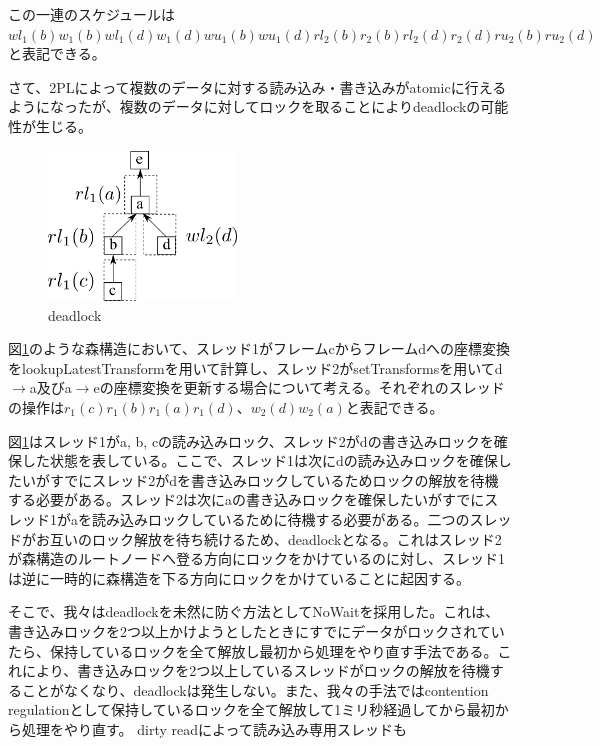 \documentclass[a4paper]{jreport}	%
\begin{document}
この一連のスケジュールは$wl_1(b)w_1(b)wl_1(d)w_1(d)wu_1(b)wu_1(d)rl_2(b)r_2(b)rl_2(d)r_2(d)ru_2(b)ru_2(d)$と表記できる。

さて、2PLによって複数のデータに対する読み込み・書き込みがatomicに行えるようになったが、複数のデータに対してロックを取ることによりdeadlockの可能性が生じる。


\begin{figure}[h] 
\centering
\includegraphics[width=5cm]{deadlock}
\caption{deadlock}
\label{fig:deadlock}
\end{figure}

図\ref{fig:deadlock}のような森構造において、スレッド1がフレームcからフレームdへの座標変換をlookupLatestTransformを用いて計算し、スレッド2がsetTransformsを用いてd$\rightarrow$a及びa$\rightarrow$eの座標変換を更新する場合について考える。それぞれのスレッドの操作は$r_1(c)r_1(b)r_1(a)r_1(d)$、$w_2(d)w_2(a)$と表記できる。

図\ref{fig:deadlock}はスレッド1がa, b, cの読み込みロック、スレッド2がdの書き込みロックを確保した状態を表している。ここで、スレッド1は次にdの読み込みロックを確保したいがすでにスレッド2がdを書き込みロックしているためロックの解放を待機する必要がある。スレッド2は次にaの書き込みロックを確保したいがすでにスレッド1がaを読み込みロックしているために待機する必要がある。二つのスレッドがお互いのロック解放を待ち続けるため、deadlockとなる。これはスレッド2が森構造のルートノードへ登る方向にロックをかけているのに対し、スレッド1は逆に一時的に森構造を下る方向にロックをかけていることに起因する。

そこで、我々はdeadlockを未然に防ぐ方法としてNoWait\cite{2PL}を採用した。これは、書き込みロックを2つ以上かけようとしたときにすでにデータがロックされていたら、保持しているロックを全て解放し最初から処理をやり直す手法である。これにより、書き込みロックを2つ以上しているスレッドがロックの解放を待機することがなくなり、deadlockは発生しない。また、我々の手法ではcontention regulationとして保持しているロックを全て解放して1ミリ秒経過してから最初から処理をやり直す。
dirty readによって読み込み専用スレッドも
\end{document}
